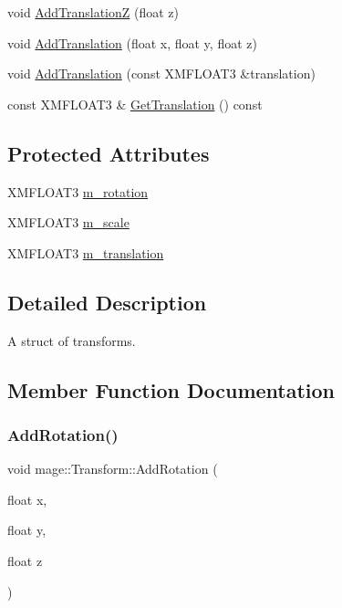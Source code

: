 \begin{DoxyCompactItemize}
\item 
void \hyperlink{structmage_1_1_transform_a0553f72a6fcf38128d2201d54584f079}{Add\+TranslationZ} (float z)
\item 
void \hyperlink{structmage_1_1_transform_a2e981e670eea4d731bda4ee68f0b7fae}{Add\+Translation} (float x, float y, float z)
\item 
void \hyperlink{structmage_1_1_transform_a1125e444c9537e09a328f37a47e61b58}{Add\+Translation} (const X\+M\+F\+L\+O\+A\+T3 \&translation)
\item 
const X\+M\+F\+L\+O\+A\+T3 \& \hyperlink{structmage_1_1_transform_af6b58761ec19c3721bbf8e8e5d4513e9}{Get\+Translation} () const
\end{DoxyCompactItemize}
\subsection*{Protected Attributes}
\begin{DoxyCompactItemize}
\item 
X\+M\+F\+L\+O\+A\+T3 \hyperlink{structmage_1_1_transform_a037b4fb338bfe79aa2ab1a2e809c40df}{m\+\_\+rotation}
\item 
X\+M\+F\+L\+O\+A\+T3 \hyperlink{structmage_1_1_transform_a25d15c85b93037bab5b755c86bef0b54}{m\+\_\+scale}
\item 
X\+M\+F\+L\+O\+A\+T3 \hyperlink{structmage_1_1_transform_a57e27b28e0cf85be034055a68513ad79}{m\+\_\+translation}
\end{DoxyCompactItemize}


\subsection{Detailed Description}
A struct of transforms. 

\subsection{Member Function Documentation}
\hypertarget{structmage_1_1_transform_a71126843acf10e00d0381b5463978aba}{}\label{structmage_1_1_transform_a71126843acf10e00d0381b5463978aba} 
\subsubsection{\texorpdfstring{Add\+Rotation()}{AddRotation()}\hspace{0.1cm}{\footnotesize\ttfamily [1/2]}}
{\footnotesize\ttfamily void mage\+::\+Transform\+::\+Add\+Rotation (\begin{DoxyParamCaption}\item[{float}]{x,  }\item[{float}]{y,  }\item[{float}]{z }\end{DoxyParamCaption})}

